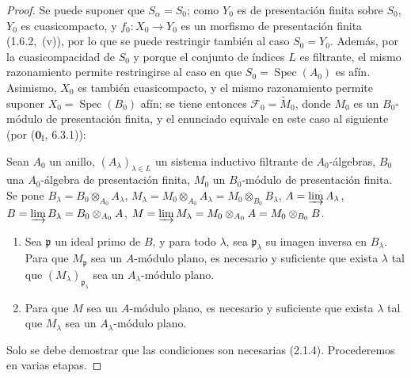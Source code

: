 \begin{proof}
Se puede suponer que $S_\alpha=S_0$; como $Y_0$ es de presentación finita sobre $S_0$, $Y_0$ es cuasicompacto, y $f_0:X_0\to Y_0$ es un morfismo de presentación finita (1.6.2,~(\textup{v})), por lo que se puede restringir también al caso $S_0=Y_0$. Además, por la cuasicompacidad de $S_0$ y porque el conjunto de índices $L$ es filtrante, el mismo razonamiento permite restringirse al caso en que $S_0=\operatorname{Spec}(A_0)$ es afín. Asimismo, $X_0$ es también cuasicompacto, y el mismo razonamiento permite suponer $X_0=\operatorname{Spec}(B_0)$ afín; se tiene entonces $\mathcal F_0=\widetilde M_0$, donde $M_0$ es un $B_0$-módulo de presentación finita, y el enunciado  equivale en este caso al siguiente (por ($\mathbf 0_{\mathrm I}$, 6.3.1)):

\begin{corollary}[11.2.6.1]
\label{IV.11.2.6.1}
Sean $A_0$ un anillo, $(A_\lambda)_{\lambda\in L}$ un sistema inductivo
filtrante de $A_0$-álgebras, $B_0$ una $A_0$-álgebra de presentación finita,
$M_0$ un $B_0$-módulo de presentación finita. Se pone
$B_\lambda=B_0\otimes_{A_0}A_\lambda$,
$M_\lambda=M_0\otimes_{A_0}A_\lambda=M_0\otimes_{B_0}B_\lambda$,
$A=\varinjlim A_\lambda$, $B=\varinjlim B_\lambda=B_0\otimes_{A_0}A$,
$M=\varinjlim M_\lambda=M_0\otimes_{A_0}A=M_0\otimes_{B_0}B$.
\begin{enumerate}[label=\emph{(\roman*)}]
\item Sea $\mathfrak p$ un ideal primo de $B$, y para todo $\lambda$,
sea $\mathfrak p_\lambda$ su imagen inversa en $B_\lambda$. Para que
$M_{\mathfrak p}$ sea un $A$-módulo plano, es necesario y suficiente que exista
$\lambda$ tal que $(M_\lambda)_{\mathfrak p_\lambda}$ sea un
$A_\lambda$-módulo plano.
\item Para que $M$ sea un $A$-módulo plano, es necesario y suficiente que exista
$\lambda$ tal que $M_\lambda$ sea un $A_\lambda$-módulo plano.
\end{enumerate}
\end{corollary}

Solo se debe demostrar que las condiciones son necesarias (2.1.4).
Procederemos en varias etapas.


\end{proof}
